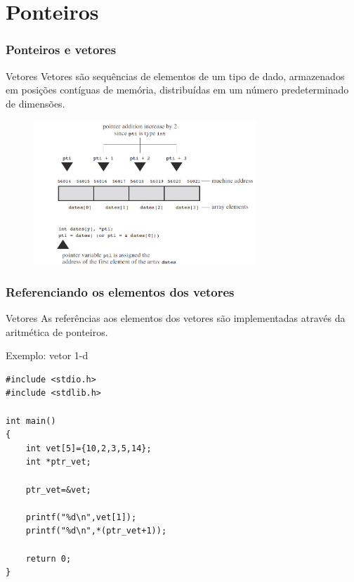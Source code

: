 \section{Ponteiros}
\begin{frame}
\frametitle{Ponteiros e vetores}

\begin{block}{Vetores}
\justifying
Vetores são sequências de elementos de um tipo de dado, armazenados em posições contíguas de memória, distribuídas em um número predeterminado de dimensões.
\end{block}

	\begin{figure}[h]
		\centering
		\includegraphics[width=0.75\textwidth]{Imagens/Imag02.png}
	\end{figure}


\end{frame}



\begin{frame}[fragile]
  \frametitle{Referenciando os elementos dos vetores}
  
\begin{block}{Vetores}
\justifying
As referências aos elementos dos vetores são implementadas através da aritmética de ponteiros.
\end{block}

  \begin{block}{Exemplo: vetor 1-d}
  \begin{lstlisting}
#include <stdio.h>
#include <stdlib.h>

int main()
{
    int vet[5]={10,2,3,5,14};
    int *ptr_vet;

    ptr_vet=&vet;

    printf("%d\n",vet[1]);
    printf("%d\n",*(ptr_vet+1));

    return 0;
}
  \end{lstlisting}
  \end{block}
\end{frame}

